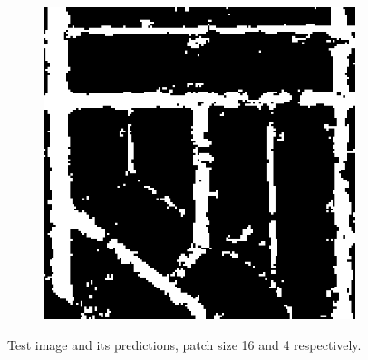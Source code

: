 \documentclass[10pt,conference,compsocconf]{IEEEtran}
\begin{document}
\begin{figure}[htbp]
\begin{subfigure}[b]{0.15\textwidth}
	\end{subfigure}
	\begin{subfigure}[b]{0.15\textwidth}
		\includegraphics[width=\textwidth]{images/visualize_pred/pred_patch_10.png}
	\end{subfigure}
	\caption{Test image and its predictions, patch size 16 and 4 respectively.}
	\label{fig:animals}
\end{figure}
\end{document}

